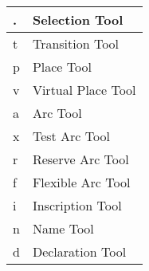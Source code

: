 \medskip

\begin{center}
\begin{tabular}[htp]{|l|l|}
  \hline
  . & Selection Tool     \\
  \hline
  t & Transition Tool\\
  \hline
  p & Place Tool\\
  \hline
  v & Virtual Place Tool\\
  \hline
  a & Arc Tool\\
  \hline
  x & Test Arc Tool\\
  \hline
  r & Reserve Arc Tool\\
  \hline
  f & Flexible Arc Tool\\
  \hline
  i & Inscription Tool\\
  \hline
  n & Name Tool\\
  \hline
  d & Declaration Tool\\
  \hline
\end{tabular}
\end{center}





